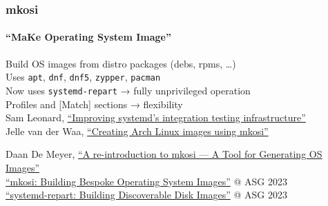 \documentclass[]{beamer}
\newcommand\pp\pause
\begin{document}
\begin{frame}
  \frametitle{mkosi}
  \framesubtitle{``\textbf{M}a\textbf{K}e \textbf{O}perating \textbf{S}ystem \textbf{I}mage''}

  Build OS images from distro packages (debs, rpms, …)
  \\

  \pp
  Uses \texttt{apt}, \texttt{dnf}, \texttt{dnf5}, \texttt{zypper}, \texttt{pacman}
  \\

  \pp
  Now uses \texttt{systemd-repart} → fully unprivileged operation
  \\

  \pp
  Profiles and [Match] sections → flexibility
  \\
  
  \small
  \pp
  Sam Leonard,
  \href{https://cfp.all-systems-go.io/all-systems-go-2024/talk/9JKWCT/}
       {``Improving systemd’s integration testing infrastructure''}
  \\\quad
  Jelle van der Waa,
  \href{https://cfp.all-systems-go.io/all-systems-go-2024/talk/QFUGLT/}
      {``Creating Arch Linux images using mkosi''}

  \pp

  Daan De Meyer,
  \href{https://0pointer.net/blog/a-re-introduction-to-mkosi-a-tool-for-generating-os-images.html}
       {``A re-introduction to mkosi --- A Tool for Generating OS Images''}\\
  \href{https://media.ccc.de/v/all-systems-go-2023-190-mkosi-building-bespoke-operating-system-images}
       {``mkosi: Building Bespoke Operating System Images''} @ ASG 2023\\
  \href{https://media.ccc.de/v/all-systems-go-2023-191-systemd-repart-building-discoverable-disk-images}
       {``systemd-repart: Building Discoverable Disk Images''} @ ASG 2023\\

\end{frame}
\end{document}
